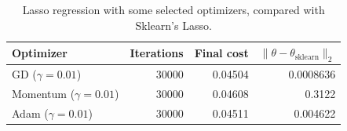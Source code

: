 \begin{table}[htbp]
    \centering
    \caption{Lasso regression with some selected optimizers, compared with Sklearn's Lasso.}
    \label{tab:lasso-optimizers}
\begin{tabular}{lrrr}
\hline\hline
Optimizer & Iterations & Final cost & $\|\theta-\theta_{\mathrm{sklearn}}\|_2$ \\
\hline
GD ($\gamma=0.01$) & 30000 & 0.04504 & 0.0008636 \\
Momentum ($\gamma=0.01$) & 30000 & 0.04608 & 0.3122 \\
Adam ($\gamma=0.01$) & 30000 & 0.04511 & 0.004622 \\
\hline\hline
\end{tabular}
\end{table}
